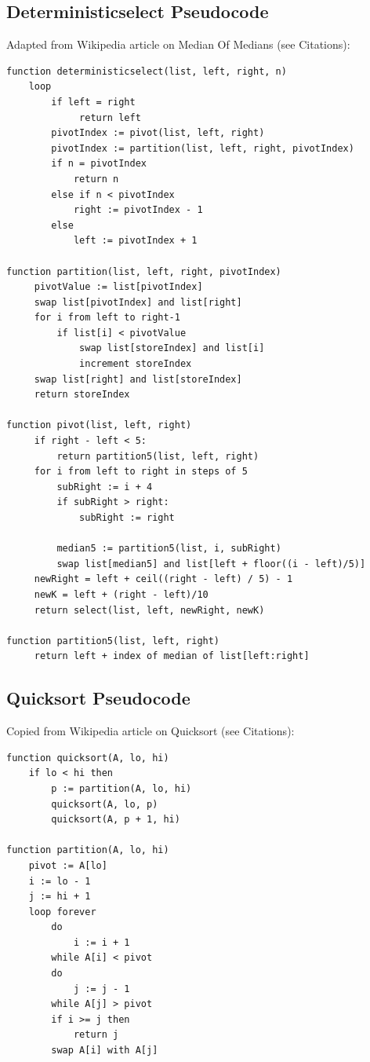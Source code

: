 \documentclass{article}
\begin{document}
\subsection*{Deterministicselect Pseudocode}
Adapted from Wikipedia article on Median Of Medians (see Citations):

\begin{lstlisting}
function deterministicselect(list, left, right, n)
    loop
        if left = right
             return left
        pivotIndex := pivot(list, left, right)
        pivotIndex := partition(list, left, right, pivotIndex)
        if n = pivotIndex
            return n
        else if n < pivotIndex
            right := pivotIndex - 1
        else
            left := pivotIndex + 1
            
function partition(list, left, right, pivotIndex)
     pivotValue := list[pivotIndex]
     swap list[pivotIndex] and list[right]
     for i from left to right-1
         if list[i] < pivotValue
             swap list[storeIndex] and list[i]
             increment storeIndex
     swap list[right] and list[storeIndex]
     return storeIndex
     
function pivot(list, left, right)
     if right - left < 5:
         return partition5(list, left, right)
     for i from left to right in steps of 5
         subRight := i + 4
         if subRight > right:
             subRight := right

         median5 := partition5(list, i, subRight)
         swap list[median5] and list[left + floor((i - left)/5)]
     newRight = left + ceil((right - left) / 5) - 1
     newK = left + (right - left)/10
     return select(list, left, newRight, newK)
     
function partition5(list, left, right)
     return left + index of median of list[left:right]
\end{lstlisting}


\subsection*{Quicksort Pseudocode}
Copied from Wikipedia article on Quicksort (see Citations):

\begin{lstlisting}
function quicksort(A, lo, hi)
    if lo < hi then
        p := partition(A, lo, hi)
        quicksort(A, lo, p)
        quicksort(A, p + 1, hi)

function partition(A, lo, hi)
    pivot := A[lo]
    i := lo - 1
    j := hi + 1
    loop forever
        do
            i := i + 1
        while A[i] < pivot
        do
            j := j - 1
        while A[j] > pivot
        if i >= j then
            return j
        swap A[i] with A[j]
\end{lstlisting}
\end{document}
